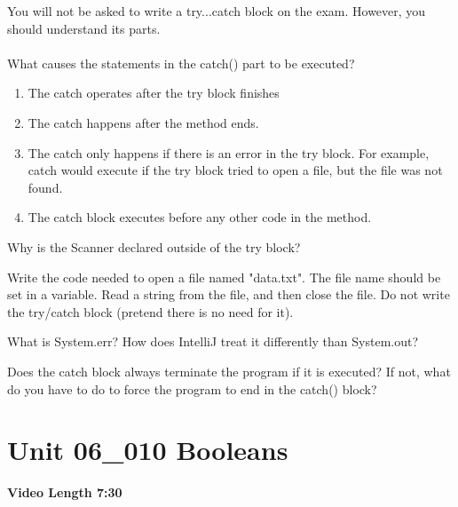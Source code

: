 \documentclass[letterpaper,12pt]{exam}
\newcommand{\unit}{Unit 06}
\begin{document}
\begin{questions}
\begin{samepage}
    \question You will not be asked to write a try{}...catch{} block on the exam.  However, you should understand its parts.\\
    \\What causes the statements in the catch(){} part to be executed?
    \begin{enumerate}
        \item The catch operates after the try block finishes
        \item The catch happens after the method ends.
        \item The catch only happens if there is an error in the try{} block.  For example, catch would execute if the try block tried to open a file, but the file was not found.
        \item The catch block executes before any other code in the method.
       \end{enumerate}
\end{samepage}

\begin{samepage}
    \question Why is the Scanner declared outside of the try{} block?
    \vspace{5mm}
\end{samepage}

\begin{samepage}
    \question Write the code needed to open a file named "data.txt".  The file name should be set in a variable.  Read a string from the file, and then close the file.  Do not write the try/catch block (pretend there is no need for it).
    \vspace{5mm}
\end{samepage}

\begin{samepage}
    \question What is System.err?  How does IntelliJ treat it differently than System.out?
    \vspace{5mm}
\end{samepage}

\begin{samepage}
    \question Does the catch block always terminate the program if it is executed?  If not, what do you have to do to force the program to end in the catch() block?
    \vspace{5mm}
\end{samepage}

\section*{\unit\_010 Booleans} %
\noindent \textbf{Video Length 7:30}


\end{questions}
\end{document}

